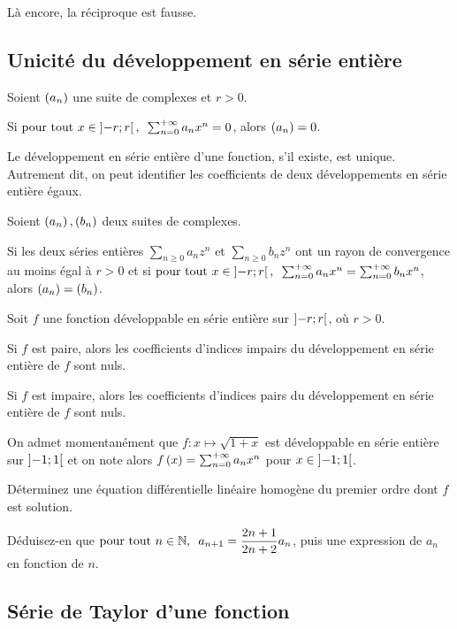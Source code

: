 Là encore, la réciproque est fausse.

\subsection{Unicité du développement en série entière}

\begin{prop}
Soient \(\left(a_n\right)\) une suite de complexes et \(r>0\).

Si \(\quantifs{\tpt x\in\intervee{-r}{r}}\sum_{n=0}^{\pinf}a_nx^n=0\), alors \(\left(a_n\right)=0\).
\end{prop}

Le développement en série entière d'une fonction, s'il existe, est unique. Autrement dit, on peut identifier les coefficients de deux développements en série entière égaux.

\begin{cor}
Soient \(\left(a_n\right),\left(b_n\right)\) deux suites de complexes.

Si les deux séries entières \(\sum_{n\geq0}a_nz^n\) et \(\sum_{n\geq0}b_nz^n\) ont un rayon de convergence au moins égal à \(r>0\) et si \(\quantifs{\tpt x\in\intervee{-r}{r}}\sum_{n=0}^{\pinf}a_nx^n=\sum_{n=0}^{\pinf}b_nx^n\), alors \(\left(a_n\right)=\left(b_n\right)\).
\end{cor}

\begin{cor}
Soit \(f\) une fonction développable en série entière sur \(\left]-r;r\right[\), où \(r>0\).

Si \(f\) est paire, alors les coefficients d'indices impairs du développement en série entière de \(f\) sont nuls.

Si \(f\) est impaire, alors les coefficients d'indices pairs du développement en série entière de \(f\) sont nuls.
\end{cor}

\begin{exo}
On admet momentanément que \(f:x\mapsto\sqrt{1+x}\) est développable en série entière sur \(\left]-1;1\right[\) et on note alors \(f\left(x\right)=\sum_{n=0}^{+\infty}a_nx^n\) pour \(x\in\left]-1;1\right[\).

Déterminez une équation différentielle linéaire homogène du premier ordre dont \(f\) est solution.

Déduisez-en que \(\quantifs{\tpt n\in\N}a_{n+1}=\dfrac{2n+1}{2n+2}a_n\), puis une expression de \(a_n\) en fonction de \(n\).
\end{exo}

\subsection{Série de Taylor d'une fonction}

